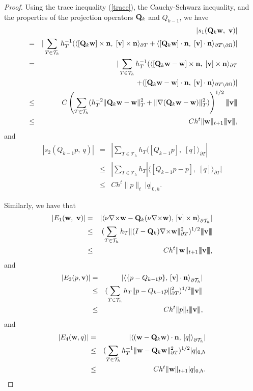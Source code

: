 \documentclass[11pt]{amsart}
\newcommand{\bw}{{\bf w}}
\newcommand{\bv}{{\bf v}}
\newcommand{\bQ}{{\bf Q}}
\newcommand{\curl}{{\nabla\times}}
\def\T{{\mathcal T}}
\def\pT{{\partial T}}
\def\l{{\langle}}
\def\r{{\rangle}}
\def\bn{{\bf n}}
\def\3bar{{|\hspace{-.02in}|\hspace{-.02in}|}}
\begin{document}
\begin{proof}
Using the trace inequality (\ref{trace}), the Cauchy-Schwarz inequality, and the properties of the projection operators $\bQ_k$ and $Q_{k-1}$, we have
\begin{eqnarray*} & &|s_1(\bQ_k\bw,\ \bv)|\\
&=&|\sum_{T\in\T_h} h_T^{-1}(\langle [\bQ_k\bw]\times\bn,\; [\bv]\times\bn\rangle_\pT+\langle [\bQ_k\bw]\cdot\bn,\; [\bv]\cdot\bn\rangle_{\pT\setminus\partial\Omega})|\\
&=&|\sum_{T\in\T_h} h_T^{-1}(\langle [\bQ_k\bw-\bw]\times\bn,\; [\bv]\times\bn\rangle_\pT\\
 &&\quad +\langle [\bQ_k\bw-\bw]\cdot\bn,\; [\bv]\cdot\bn\rangle_{\pT\setminus\partial\Omega})|\\
&\le& C\left(\sum_{T\in\T_h}(h_T^{-2}\|\bQ_k\bw-\bw\|_T^2+\|\nabla (\bQ_k\bw-\bw)\|_T^2)\right)^{1/2} \3bar\bv\3bar\\
&\le& Ch^t\|\bw\|_{t+1} \3bar\bv\3bar,
\end{eqnarray*}
and
\begin{eqnarray*}
|s_2(Q_{k-1} p,\ q)|&=&|\sum_{T\in\T_h} h_T\langle [Q_{k-1} p],\; [q]\rangle_\pT|\\
&\le &|\sum_{T\in\T_h}h_T |\langle [Q_{k-1}p- p],\; [q]\rangle_\pT|\\
&\le& Ch^t\|p\|_{t}\ |q|_{0,h}.
\end{eqnarray*}

Similarly, we have  that
\begin{eqnarray*}
|E_1(\bw,\ \bv)|&=& |\l\nu\curl\bw-\bQ_k(\nu\curl\bw),\,[\bv]\times\bn\r_{\partial\T_h}|\\
&\le& (\sum_{T\in\T_h}h_T\|(I-\bQ_k)\curl\bw\|_\pT^2)^{1/2}\3bar\bv\3bar\\
&\le& Ch^t\|\bw\|_{t+1} \3bar\bv\3bar,
\end{eqnarray*}
and
\begin{eqnarray*}
|E_3(p,\bv)|&=& |\l \{p-Q_{k-1}p\},\,[\bv]\cdot\bn\r_{\partial\T_h}|\\
&\le& (\sum_{T\in\T_h}h_T\|p-Q_{k-1}p\|_\pT^2)^{1/2}\3bar\bv\3bar\\
&\le& Ch^t\|p\|_{t} \3bar\bv\3bar,
\end{eqnarray*}
and
\begin{eqnarray*}
|E_4(\bw,q)|&=&|\l (\bw-\bQ_k\bw)\cdot\bn,\,[q]\r_{\partial\T_h}|\\
&\le& (\sum_{T\in\T_h}h_T^{-1}\|\bw-\bQ_k\bw\|_\pT^2)^{1/2} |q|_{0,h}\\
&\le& Ch^t\|\bw\|_{t+1} |q|_{0,h}.
\end{eqnarray*}



\end{proof}
\end{document}
